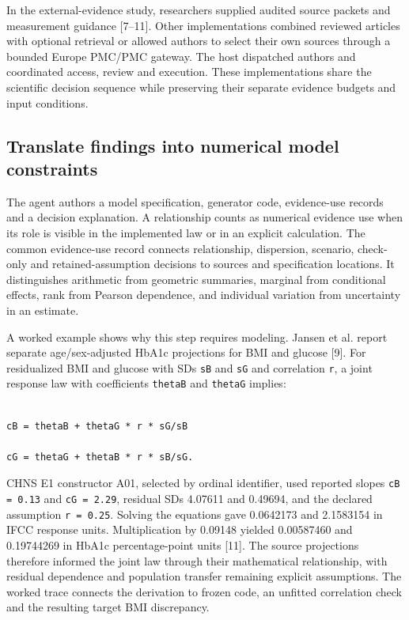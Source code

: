 \documentclass[sigconf,anonymous,review]{acmart}
\begin{document}
In the external-evidence study, researchers supplied audited source packets and measurement guidance [7–\allowbreak{}11]. Other implementations combined reviewed articles with optional retrieval or allowed authors to select their own sources through a bounded Europe PMC/\allowbreak{}PMC gateway. The host dispatched authors and coordinated access, review and execution. These implementations share the scientific decision sequence while preserving their separate evidence budgets and input conditions.


\subsection{Translate findings into numerical model constraints}

The agent authors a model specification, generator code, evidence-use records and a decision explanation. A relationship counts as numerical evidence use when its role is visible in the implemented law or in an explicit calculation. The common evidence-use record connects relationship, dispersion, scenario, check-only and retained-assumption decisions to sources and specification locations. It distinguishes arithmetic from geometric summaries, marginal from conditional effects, rank from Pearson dependence, and individual variation from uncertainty in an estimate.


A worked example shows why this step requires modeling. Jansen et al. report separate age/\allowbreak{}sex-adjusted HbA1c projections for BMI and glucose [9]. For residualized BMI and glucose with SDs \texttt{sB} and \texttt{sG} and correlation \texttt{r}, a joint response law with coefficients \texttt{thetaB} and \texttt{thetaG} implies:


\noindent\begin{minipage}{\columnwidth}

\begin{lstlisting}

cB = thetaB + thetaG * r * sG/sB

cG = thetaG + thetaB * r * sB/sG.

\end{lstlisting}

\end{minipage}

CHNS E1 constructor A01, selected by ordinal identifier, used reported slopes \texttt{cB = 0.13} and \texttt{cG = 2.29}, residual SDs 4.07611 and 0.49694, and the declared assumption \texttt{r = 0.25}. Solving the equations gave 0.0642173 and 2.1583154 in IFCC response units. Multiplication by 0.09148 yielded 0.00587460 and 0.19744269 in HbA1c percentage-point units [11]. The source projections therefore informed the joint law through their mathematical relationship, with residual dependence and population transfer remaining explicit assumptions. The worked trace connects the derivation to frozen code, an unfitted correlation check and the resulting target BMI discrepancy.
\end{document}
